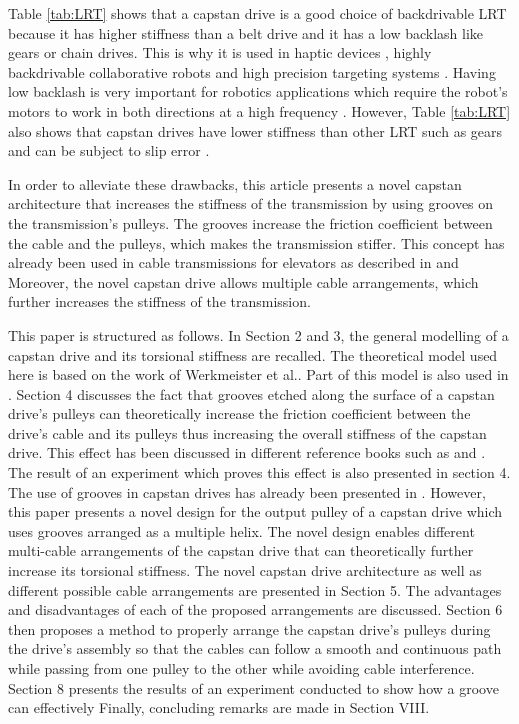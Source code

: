 \documentclass[10pt,cleanfoot]{asme2ej}
\begin{document}
\par Table \ref{tab:LRT} shows that a capstan drive is a good choice of backdrivable LRT because it has higher stiffness than a belt drive and it has a low backlash like gears or chain drives. This is why it is used in haptic devices \cite{perret2014advantages}\cite{baser2013kinematic}, highly backdrivable collaborative robots \cite{townsend1988effect}\cite{rooks2006harmonious}\cite{phan2014guided} and high precision targeting systems \cite{lu2015development}\cite{lu2012non}\cite{lu2013transmission}\cite{xie2019analytical}. Having low backlash is very important for  robotics applications which require the robot's motors to work in both directions at a high frequency \cite{brooks1990telerobotic}\cite{gealy2019quasi}. However, Table \ref{tab:LRT} also shows that capstan drives have lower stiffness than other LRT such as gears and can be subject to slip error \cite{lu2013transmission}\cite{baser2010theoretical}.\par
In order to alleviate these drawbacks, this article presents a novel capstan architecture that increases the stiffness of the transmission by using grooves on the transmission's pulleys. The grooves increase the friction coefficient between the cable and the pulleys, which makes the transmission stiffer. This concept has already been used in cable transmissions for elevators as described in \cite{elevator_german} and \cite{elevator} Moreover, the novel capstan drive allows multiple cable arrangements, which further increases the stiffness of the transmission.\par This paper is structured as follows. In Section 2 and 3, the general modelling of a capstan drive and its torsional stiffness are recalled. The theoretical model used here is based on the work of Werkmeister et al.\cite{werkmeister2007theoretical}. Part of this model is also used in \cite{baser2010theoretical}. Section 4 discusses the fact that grooves etched along the surface of a capstan drive's pulleys can theoretically increase the friction coefficient between the drive's cable and its pulleys thus increasing the overall stiffness of the capstan drive. This effect has been discussed in different reference books such as \cite{elevator_german} and \cite{elevator}. The result of an experiment which proves this effect is also presented in  section 4. The use of grooves in capstan drives has already been presented in \cite{lu2012non}. However, this paper presents a novel design for the output pulley of a capstan drive which uses grooves arranged as a multiple helix. The novel design enables different multi-cable arrangements of the capstan drive that can theoretically further increase its torsional stiffness. The novel capstan drive architecture as well as different possible cable arrangements are presented in Section 5. The advantages and disadvantages  of each of the proposed arrangements are discussed. Section 6 then proposes a method to properly arrange the capstan drive's pulleys during the drive's assembly so that the cables can follow a smooth and continuous path while passing from one pulley to the other while avoiding cable interference. Section 8 presents the results of an experiment conducted to show how a groove can effectively  Finally, concluding remarks are made in Section VIII.
\end{document}
